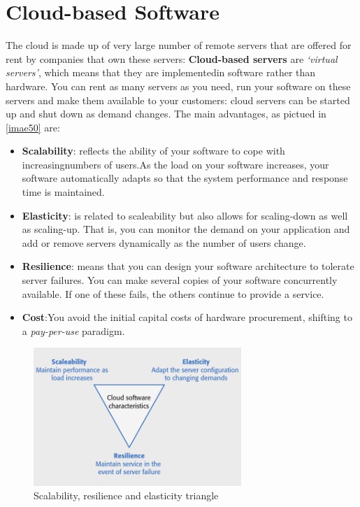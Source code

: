 \documentclass[10pt,a4paper]{report}
\begin{document}
\chapter{Cloud-based Software}
The cloud is made up of very large number of remote servers that are offered for rent by companies that own these servers: \textbf{Cloud-based servers} are \textit{‘virtual servers’}, which means that they are implementedin software rather than hardware.
You can rent as many servers as you need, run your software on these servers and make them available to your customers: cloud servers can be started up and shut down as demand changes. 
The main advantages, as pictued in \ref{imae50} are:
\begin{itemize}
	\item \textbf{Scalability}: reflects the ability of your software to cope with
	increasingnumbers of users.As the load on your software increases, your software automatically adapts so
	that the system performance and response time is maintained.
	\item \textbf{Elasticity}:  is related to scaleability but also allows for scaling-down as well
	as scaling-up.
	That is, you can monitor the demand on your application and add or remove servers dynamically as the number of users change.
	\item \textbf{Resilience}:  means that you can design your software architecture to
	tolerate server failures. You can make several copies of your software concurrently available. If one of
	these fails, the others continue to provide a service.
	\item \textbf{Cost}:You avoid the initial capital costs of hardware procurement, shifting to a \textit{pay-per-use} paradigm. 
\end{itemize}
   \begin{figure}[h]
	\centering
	\includegraphics[width=0.7\textwidth]{image50}
	\caption{Scalability, resilience and elasticity triangle}
	\label{image50}
\end{figure}
\end{document}
